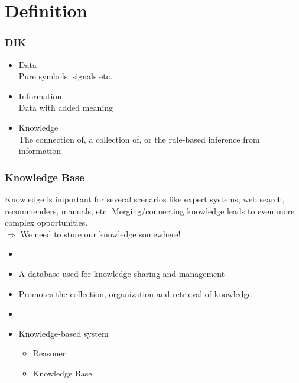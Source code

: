 \section{Definition}


\begin{frame}
\frametitle{DIK}
\begin{itemize}
  \item Data\\ Pure symbols, signals etc.
  \item Information\\ Data with added meaning
  \item Knowledge\\ The connection of, a collection of, or the
  rule-based inference from information
\end{itemize}

\end{frame} 

\begin{frame}
\frametitle{Knowledge Base}
Knowledge is important for several scenarios like expert systems, web search,
recommenders, manuals, etc. Merging/connecting knowledge leads to even more
complex opportunities. \\ $\Rightarrow$ We need to store our knowledge
somewhere!
\begin{itemize}
  \item[]
	\item A database used for knowledge sharing and management
	\item Promotes the collection, organization and retrieval of knowledge
  \item[]
  \item Knowledge-based system
  \begin{itemize}
    \item Reasoner
    \item Knowledge Base
  \end{itemize}
\end{itemize}

\end{frame}

